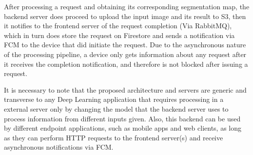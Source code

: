 After processing a request and obtaining its corresponding segmentation map, the backend server does proceed to upload the input image and its result to S3, then it notifies to the frontend server of the request completion (Via RabbitMQ), which in turn does store the request on Firestore and sends a notification via FCM to the device that did initiate the request. Due to the asynchronous nature of the processing pipeline, a device only gets information about any request after it receives the completion notification, and therefore is not blocked after issuing a request.

It is necessary to note that the proposed architecture and servers are generic and transverse to any Deep Learning application that requires processing in a external server only by changing the model that the backend server uses to process information from different inputs given. Also, this backend can be used by different endpoint applications, such as mobile apps and web clients, as long as they can perform HTTP requests to the frontend server(s) and receive asynchronous notifications via FCM. 

